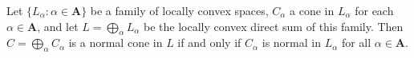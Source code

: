 Let $\{L_\alpha : \alpha \in \mathbf{A}\}$ be a family of locally convex spaces, $C_\alpha$ a cone in $L_\alpha$ for each $\alpha \in \mathbf{A}$, and let $L = \bigoplus_\alpha L_\alpha$ be the locally convex direct sum of this family. Then $C = \bigoplus_\alpha C_\alpha$ is a normal cone in $L$ if and only if $C_\alpha$ is normal in $L_\alpha$ for all $\alpha \in \mathbf{A}$.
